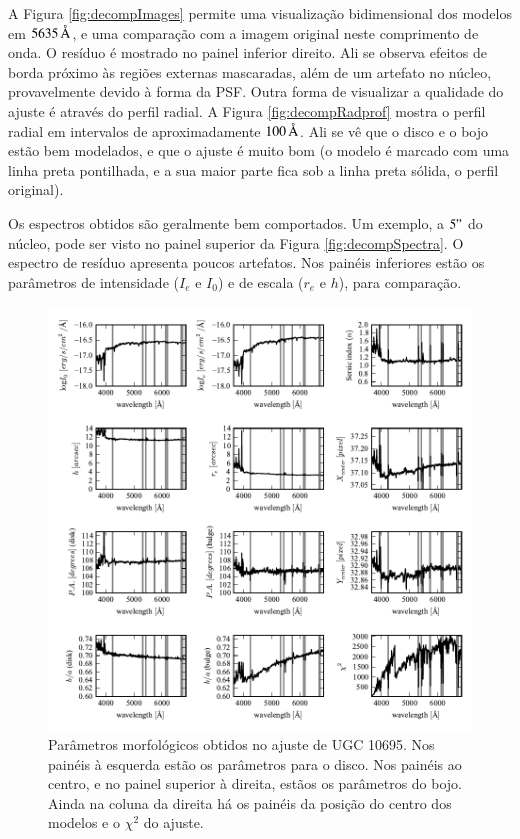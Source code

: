 A Figura \ref{fig:decompImages} permite uma visualização bidimensional dos
modelos em $5635\,\text{\normalfont\AA}$, e uma comparação com a imagem original neste
comprimento de onda. O resíduo é mostrado no painel inferior direito. Ali se observa efeitos
de borda próximo às regiões externas mascaradas, além de um artefato no núcleo,
provavelmente devido à forma da PSF. Outra forma de visualizar a qualidade do
ajuste é através do perfil radial. A Figura \ref{fig:decompRadprof} mostra o
perfil radial em intervalos de aproximadamente $100\,\text{\normalfont\AA}$. Ali se vê que o
disco e o bojo estão bem modelados, e que o ajuste é muito bom (o modelo é
marcado com uma linha preta pontilhada, e a sua maior parte fica sob a linha
preta sólida, o perfil original).

Os espectros obtidos são geralmente bem comportados. Um exemplo, a $5"$ do
núcleo, pode ser visto no painel superior da Figura \ref{fig:decompSpectra}.
O espectro de resíduo apresenta poucos artefatos. Nos painéis inferiores estão
os parâmetros de intensidade ($I_e$ e $I_0$) e de escala ($r_e$ e $h$), para
comparação.

\begin{figure}
	\includegraphics{figuras/decomp-fit-parameters}
	\caption[Parâmetros morfológicos] {Parâmetros morfológicos obtidos no ajuste
	de UGC 10695. Nos painéis à esquerda estão os parâmetros para o disco. Nos
	painéis ao centro, e no painel superior à direita, estãos os parâmetros do
	bojo. Ainda na coluna da direita há os painéis da posição do centro dos
	modelos e o $\chi^2$ do ajuste.}
	\label{fig:decompParams}
\end{figure}

